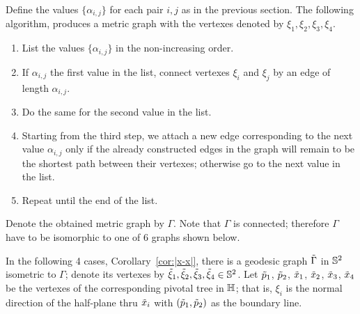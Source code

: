 Define the values $\{\alpha_{i,j}\}$ for each pair $i,j$ as in the previous section.
The following algorithm, produces a metric graph with the vertexes denoted by $\xi_1,\xi_2, \xi_3,\xi_4$.
\begin{enumerate}[1.]
\item List the values $\{\alpha_{i,j}\}$ in the non-increasing order.
\item If $\alpha_{i,j}$ the first value in the list, connect vertexes $\xi_i$ and $\xi_j$ by an edge of length $\alpha_{i,j}$.
\item Do the same for the second value  in the list.
\item Starting from the third step, we attach a new edge corresponding to the next value $\alpha_{i,j}$ only if the already constructed edges in the graph will remain to be the shortest path between their vertexes; otherwise go to the next value in the list. 
\item Repeat until the end of the list.
\end{enumerate}
Denote the obtained metric graph by $\Gamma$.
Note that $\Gamma$ is connected;
therefore $\Gamma$ have to be isomorphic to one of 6 graphs shown below.

In the following 4 cases, Corollary~\ref{cor:|x-x|}, there is a geodesic graph $\~\Gamma$ in $\SS^2$ isometric to $\Gamma$;
denote its vertexes by $\~\xi_1,\~\xi_2,\~\xi_3,\~\xi_4\in \SS^2$.
Let $\~p_1$, $\~p_2$, $\~x_1$, $\~x_2$, $\~x_3$, $\~x_4$ be the vertexes of the corresponding pivotal tree in $\HH$;
that is, $\xi_i$ is the normal direction of the half-plane thru $\~x_i$ with $(\~p_1,\~p_2)$ as the boundary line.


